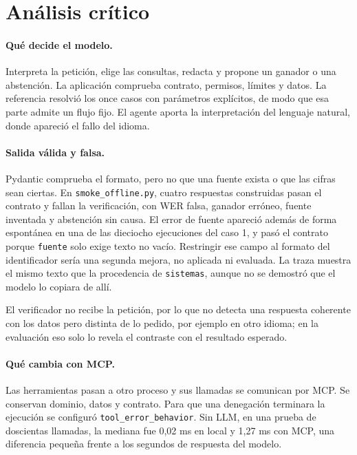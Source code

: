 
\section{Análisis crítico}

\paragraph{Qué decide el modelo.} Interpreta la petición, elige las consultas, redacta y propone un ganador o una abstención. La aplicación comprueba contrato, permisos, límites y datos. La referencia resolvió los once casos con parámetros explícitos, de modo que esa parte admite un flujo fijo. El agente aporta la interpretación del lenguaje natural, donde apareció el fallo del idioma.

\paragraph{Salida válida y falsa.} Pydantic comprueba el formato, pero no que una fuente exista o que las cifras sean ciertas. En \texttt{smoke\_offline.py}, cuatro respuestas construidas pasan el contrato y fallan la verificación, con WER falsa, ganador erróneo, fuente inventada y abstención sin causa. El error de fuente apareció además de forma espontánea en una de las dieciocho ejecuciones del caso 1, y pasó el contrato porque \texttt{fuente} solo exige texto no vacío. Restringir ese campo al formato del identificador sería una segunda mejora, no aplicada ni evaluada. La traza muestra el mismo texto que la procedencia de \texttt{sistemas}, aunque no se demostró que el modelo lo copiara de allí.

El verificador no recibe la petición, por lo que no detecta una respuesta coherente con los datos pero distinta de lo pedido, por ejemplo en otro idioma; en la evaluación eso solo lo revela el contraste con el resultado esperado.

\paragraph{Qué cambia con MCP.} Las herramientas pasan a otro proceso y sus llamadas se comunican por MCP. Se conservan dominio, datos y contrato. Para que una denegación terminara la ejecución se configuró \texttt{tool\_error\_behavior}. Sin LLM, en una prueba de doscientas llamadas, la mediana fue 0,02 ms en local y 1,27 ms con MCP, una diferencia pequeña frente a los segundos de respuesta del modelo.

